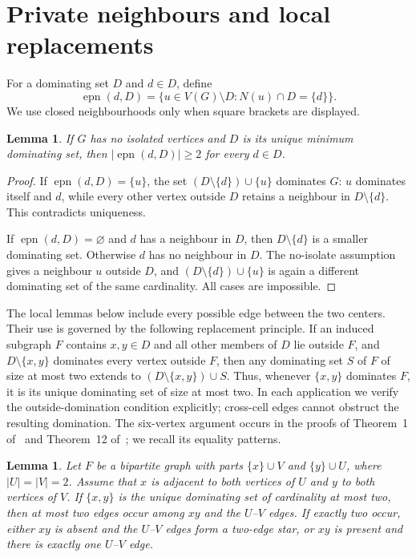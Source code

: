 \documentclass[11pt]{article}
\newtheorem{lemma}[theorem]{Lemma}
\theoremstyle{definition}
\theoremstyle{remark}
\newcommand{\epn}{\operatorname{epn}}
\begin{document}
\section{Private neighbours and local replacements}

For a dominating set $D$ and $d\in D$, define
\[
 \epn(d,D)=\{u\in V(G)\setminus D:N(u)\cap D=\{d\}\}.
\]
We use closed neighbourhoods only when square brackets are displayed.

\begin{lemma}\label{lem:private}
If $G$ has no isolated vertices and $D$ is its unique minimum dominating set,
then $|\epn(d,D)|\ge2$ for every $d\in D$.
\end{lemma}

\begin{proof}
If $\epn(d,D)=\{u\}$, the set $(D\setminus\{d\})\cup\{u\}$ dominates $G$:
$u$ dominates itself and $d$, while every other vertex outside $D$ retains a
neighbour in $D\setminus\{d\}$. This contradicts uniqueness.

If $\epn(d,D)=\varnothing$ and $d$ has a neighbour in $D$, then
$D\setminus\{d\}$ is a smaller dominating set. Otherwise $d$ has no neighbour
in $D$. The no-isolate assumption gives a neighbour $u$ outside $D$, and
$(D\setminus\{d\})\cup\{u\}$ is again a different dominating set of the same
cardinality. All cases are impossible.
\end{proof}

The local lemmas below include every possible edge between the two centers.
Their use is governed by the following replacement principle. If an induced
subgraph $F$ contains $x,y\in D$ and all other members of $D$ lie outside $F$,
and $D\setminus\{x,y\}$ dominates every vertex outside $F$, then any
dominating set $S$ of $F$ of size at most two extends to
$(D\setminus\{x,y\})\cup S$. Thus, whenever $\{x,y\}$ dominates $F$, it
is its unique dominating set of size at most two. In each application we
verify the outside-domination condition explicitly; cross-cell edges cannot
obstruct the resulting domination.
The six-vertex argument occurs in the proofs of Theorem~1 of~\cite{FRV} and
Theorem~12 of~\cite{KN}; we recall its equality patterns.

\begin{lemma}\label{lem:six}
Let $F$ be a bipartite graph with parts $\{x\}\cup V$ and $\{y\}\cup U$,
where $|U|=|V|=2$. Assume that $x$ is adjacent to both vertices of $U$ and
$y$ to both vertices of $V$. If $\{x,y\}$ is the unique dominating set of
cardinality at most two, then at most two edges occur among $xy$ and the
$U$--$V$ edges. If exactly two occur, either $xy$ is absent and the
$U$--$V$ edges form a two-edge star, or $xy$ is present and there is exactly
one $U$--$V$ edge.
\end{lemma}
\end{document}

